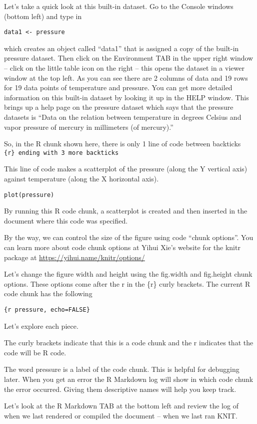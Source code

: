 \documentclass[
]{book}
\begin{document}
Let's take a quick look at this built-in dataset. Go to the Console windows (bottom left) and type in

\texttt{data1\ \textless{}-\ pressure}

which creates an object called ``data1'' that is assigned a copy of the built-in pressure dataset. Then click on the Environment TAB in the upper right window -- click on the little table icon on the right -- this opens the dataset in a viewer window at the top left. As you can see there are 2 columns of data and 19 rows for 19 data points of temperature and pressure. You can get more detailed information on this built-in dataset by looking it up in the HELP window. This brings up a help page on the pressure dataset which says that the pressure datasets is ``Data on the relation between temperature in degrees Celsius and vapor pressure of mercury in millimeters (of mercury).''

So, in the R chunk shown here, there is only 1 line of code between backticks \texttt{\{r\}\ ending\ with\ 3\ more\ backticks}

This line of code makes a scatterplot of the pressure (along the Y vertical axis) against temperature (along the X horizontal axis).

\texttt{plot(pressure)}

By running this R code chunk, a scatterplot is created and then inserted in the document where this code was specified.

By the way, we can control the size of the figure using code ``chunk options''. You can learn more about code chunk options at Yihui Xie's website for the knitr package at \url{https://yihui.name/knitr/options/}

Let's change the figure width and height using the fig.width and fig.height chunk options. These options come after the r in the \{r\} curly brackets. The current R code chunk has the following

\texttt{\{r\ pressure,\ echo=FALSE\}}

Let's explore each piece.

The curly brackets indicate that this is a code chunk and the r indicates that the code will be R code.

The word pressure is a label of the code chunk. This is helpful for debugging later. When you get an error the R Markdown log will show in which code chunk the error occurred. Giving them descriptive names will help you keep track.

Let's look at the R Markdown TAB at the bottom left and review the log of when we last rendered or compiled the document -- when we last ran KNIT.
\end{document}
